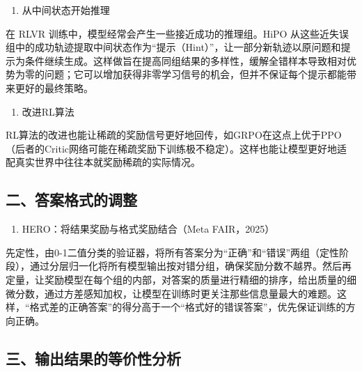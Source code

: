 \begin{enumerate}
\def\labelenumi{\arabic{enumi}.}
\setcounter{enumi}{3}
\tightlist
\item
  从中间状态开始推理
\end{enumerate}

在 RLVR 训练中，模型经常会产生一些接近成功的推理组。HiPO 从这些近失误组中的成功轨迹提取中间状态作为``提示（Hint）''，让一部分新轨迹以原问题和提示为条件继续生成。这样做旨在提高同组结果的多样性，缓解全错样本导致相对优势为零的问题；它可以增加获得非零学习信号的机会，但并不保证每个提示都能带来更好的最终策略。

\begin{enumerate}
\def\labelenumi{\arabic{enumi}.}
\setcounter{enumi}{4}
\tightlist
\item
  改进RL算法
\end{enumerate}

RL算法的改进也能让稀疏的奖励信号更好地回传，如GRPO在这点上优于PPO（后者的Critic网络可能在稀疏奖励下训练极不稳定）。这样也能让模型更好地适配真实世界中往往本就奖励稀疏的实际情况。

\hypertarget{ux4e8cux7b54ux6848ux683cux5f0fux7684ux8c03ux6574}{%
\subsection{二、答案格式的调整}\label{ux4e8cux7b54ux6848ux683cux5f0fux7684ux8c03ux6574}}

\begin{enumerate}
\def\labelenumi{\arabic{enumi}.}
\tightlist
\item
  HERO：将结果奖励与格式奖励结合（Meta FAIR，2025）
\end{enumerate}

先定性，由0-1二值分类的验证器，将所有答案分为``正确''和``错误''两组（定性阶段），通过分层归一化将所有模型输出按对错分组，确保奖励分数不越界。然后再定量，让奖励模型在每个组的内部，对答案的质量进行精细的排序，给出质量的细微分数，通过方差感知加权，让模型在训练时更关注那些信息量最大的难题。这样，``格式差的正确答案''的得分高于一个``格式好的错误答案''，优先保证训练的方向正确。

\hypertarget{ux4e09ux8f93ux51faux7ed3ux679cux7684ux7b49ux4ef7ux6027ux5206ux6790}{%
\subsection{三、输出结果的等价性分析}\label{ux4e09ux8f93ux51faux7ed3ux679cux7684ux7b49ux4ef7ux6027ux5206ux6790}}

